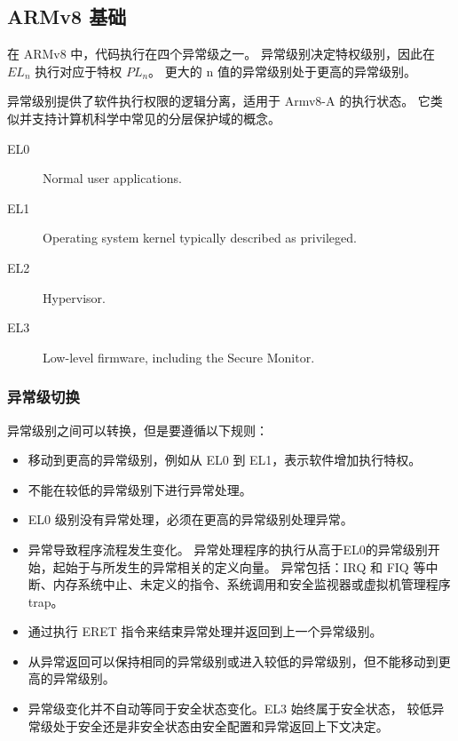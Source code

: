 \subsection{ARMv8 基础}

在 ARMv8 中，代码执行在四个异常级之一。
异常级别决定特权级别，因此在 $EL_n$ 执行对应于特权 $PL_n$。
更大的 n 值的异常级别处于更高的异常级别。

异常级别提供了软件执行权限的逻辑分离，适用于 Armv8-A 的执行状态。
它类似并支持计算机科学中常见的分层保护域的概念。

\begin{description}
    \item[EL0] Normal user applications.
    \item[EL1] Operating system kernel typically described as privileged.
    \item[EL2] Hypervisor.
    \item[EL3] Low-level firmware, including the Secure Monitor.
\end{description}

\subsubsection{异常级切换}

异常级别之间可以转换，但是要遵循以下规则：

\begin{itemize}
  \item 移动到更高的异常级别，例如从 EL0 到 EL1，表示软件增加执行特权。
  \item 不能在较低的异常级别下进行异常处理。
  \item EL0 级别没有异常处理，必须在更高的异常级别处理异常。
  \item 异常导致程序流程发生变化。
    异常处理程序的执行从高于EL0的异常级别开始，起始于与所发生的异常相关的定义向量。
    异常包括：IRQ 和 FIQ 等中断、内存系统中止、未定义的指令、系统调用和安全监视器或虚拟机管理程序 trap。
  \item 通过执行 ERET 指令来结束异常处理并返回到上一个异常级别。
  \item 从异常返回可以保持相同的异常级别或进入较低的异常级别，但不能移动到更高的异常级别。
  \item 异常级变化并不自动等同于安全状态变化。EL3 始终属于安全状态，
    较低异常级处于安全还是非安全状态由安全配置和异常返回上下文决定。
\end{itemize}

